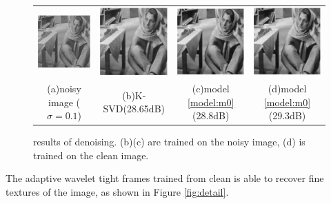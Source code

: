 \documentclass[a4paper]{article}
\begin{document}
\begin{figure}[h!]
\centering
\label{fig:bar}
\begin{tabular}{c c c c}
\includegraphics[width=3cm]{./figures/4_1_noise.eps} & \includegraphics[width=3cm]{./figures/4_3_ksvd.eps}
&\includegraphics[width=3cm]{./figures/4_4_tfnoise.eps} & \includegraphics[width=3cm]{./figures/4_5_tfclean.eps}\\
 (a)noisy image ($\sigma=0.1$)& (b)K-SVD(28.65dB) &(c)model \eqref{model:m0}(28.8dB) & (d)model \eqref{model:m0}(29.3dB) 
\end{tabular}
\caption{results of denoising. (b)(c) are trained on the noisy image, (d) is trained on the clean image.}
\end{figure}
The adaptive wavelet tight frames trained from clean is able to recover fine textures of the image, as shown in Figure \ref{fig:detail}.
\end{document}
